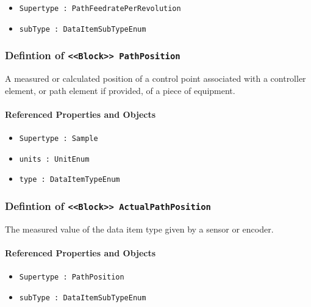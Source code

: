 \begin{itemize}
\item \texttt{Supertype : PathFeedratePerRevolution}

\item \texttt{subType : DataItemSubTypeEnum}

\end{itemize}
\FloatBarrier
\subsubsection{Defintion of \texttt{<<Block>> PathPosition}}
  \label{type:PathPosition}

\FloatBarrier

A measured or calculated position of a control point associated with a controller element, or path element if provided, of a piece of equipment.

\FloatBarrier
\paragraph{Referenced Properties and Objects}

\begin{itemize}
\item \texttt{Supertype : Sample}

\item \texttt{units : UnitEnum}

\item \texttt{type : DataItemTypeEnum}

\end{itemize}
\FloatBarrier
\subsubsection{Defintion of \texttt{<<Block>> ActualPathPosition}}
  \label{type:ActualPathPosition}

\FloatBarrier

The measured value of the data item type given by a sensor or encoder.

\FloatBarrier
\paragraph{Referenced Properties and Objects}

\begin{itemize}
\item \texttt{Supertype : PathPosition}

\item \texttt{subType : DataItemSubTypeEnum}

\end{itemize}
\FloatBarrier
